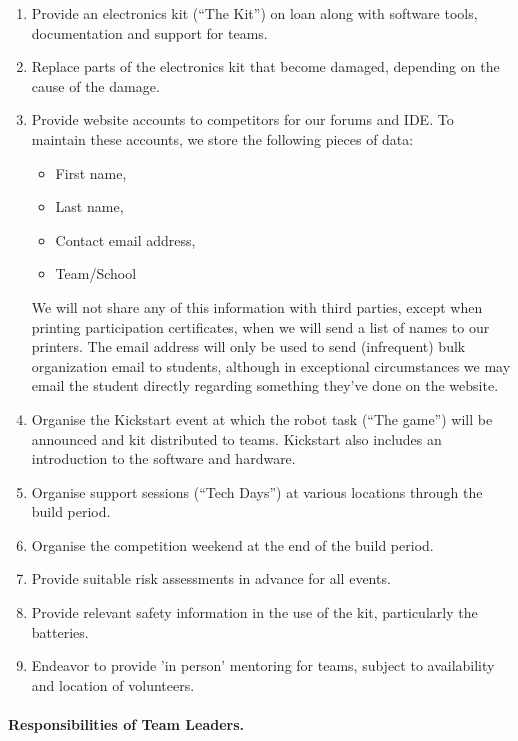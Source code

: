 \documentclass[a4paper, 11pt]{scrartcl}
\begin{document}
\begin{enumerate}
\item Provide an electronics kit (``The Kit'') on loan along with software
tools, documentation and support for teams.

\item Replace parts of the electronics kit that become damaged, depending
on the cause of the damage.

\item Provide website accounts to competitors for our forums and IDE. To
maintain these accounts, we store the following pieces of data:
\begin{itemize}
\item First name,
\item Last name,
\item Contact email address,
\item Team/School
\end{itemize}
We will not share any of this information with third parties, except when
printing participation certificates, when we will send a list of names to
our printers. The email address will only be used to send (infrequent) bulk
organization email to students, although in exceptional circumstances we
may email the student directly regarding something they've done on the
website.

\item Organise the Kickstart event at which the robot task (``The game'') will
be announced and kit distributed to teams. Kickstart also includes an
introduction to the software and hardware.

\item Organise support sessions (``Tech Days'') at various locations through
the build period.

\item Organise the competition weekend at the end of the build period.

\item Provide suitable risk assessments in advance for all events.

\item Provide relevant safety information in the use of the kit, particularly
the batteries.

\item Endeavor to provide 'in person' mentoring for teams, subject to
availability and location of volunteers.
\end{enumerate}
\paragraph{}
\textbf{Responsibilities of Team Leaders.}
\end{document}
